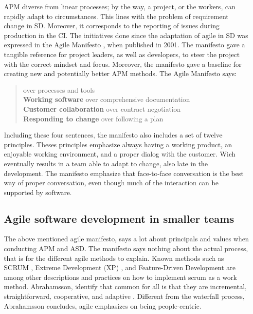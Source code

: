 APM diverse from linear processes; by the way, a project, or the workers, can rapidly adapt to circumstances. This lines with the problem of requirement change in SD. Moreover, it corresponds to the reporting of issues during production in the CI. The initiatives done since the adaptation of agile in SD was expressed in the Agile Manifesto \cite{agile_manifesto}, when published in 2001. The manifesto gave a tangible reference for project leaders, as well as developers, to steer the project with the correct mindset and focus. Moreover, the manifesto gave a baseline for creating new and potentially better APM methods. The Agile Manifesto says:
\begin{quotation}
     over processes and tools \\
    {\bf Working software} over comprehensive documentation \\
    {\bf Customer collaboration} over contract negotiation \\
    {\bf Responding to change} over following a plan \\
\end{quotation}
Including these four sentences, the manifesto also includes a set of twelve principles. Theses principles emphasize always having a working product, an enjoyable working environment, and a proper dialog with the customer. Wich eventually results in a team able to adapt to change,  also late in the development. The manifesto emphasize that face-to-face conversation is the best way of proper conversation, even though much of the interaction can be supported by software.

\subsection{Agile software development in smaller teams}
The above mentioned agile manifesto, says a lot about principals and values when conducting APM and ASD. The manifesto says nothing about the actual process, that is for the different agile methods to explain. Known methods such as SCRUM \cite{sutherland}, Extreme Development (XP) \cite{Beck:1999:EPE:318762}, and Feature-Driven Development\cite{palmer2001practical} are among other descriptions and practices on how to implement scrum as a work method. Abrahamsson, identify that common for all is that they are incremental, straightforward, cooperative, and adaptive \cite{abrahamsson2017agile}. Different from the waterfall process, Abrahamsson concludes, agile emphasizes on being people-centric. 

